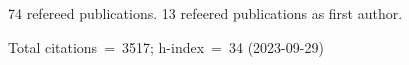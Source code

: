 74 refereed publications. 13 refeered publications as first author.

Total citations~=~3517; h-index~=~34 (2023-09-29)